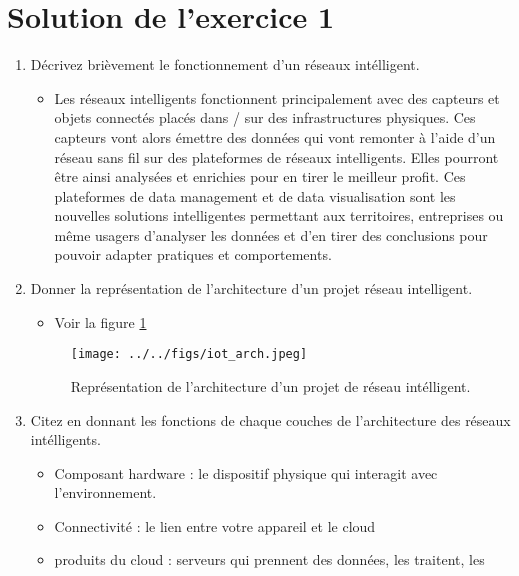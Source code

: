 \section*{Solution de l'exercice 1 \MarksTwo}

\begin{enumerate}
      \item Décrivez brièvement le fonctionnement d'un réseaux intélligent.
            \begin{itemize}
                  \item Les réseaux intelligents fonctionnent principalement avec des capteurs et objets connectés placés dans / sur des infrastructures physiques. Ces capteurs vont alors émettre des données qui vont remonter à l’aide d’un réseau sans fil sur des plateformes de réseaux intelligents. Elles pourront être ainsi analysées et enrichies pour en tirer le meilleur profit. Ces plateformes de data management et de data visualisation sont les nouvelles solutions intelligentes permettant aux territoires, entreprises ou même usagers d’analyser les données et d’en tirer des conclusions pour pouvoir adapter pratiques et comportements.
            \end{itemize}
      \item Donner la représentation de l’architecture d’un projet réseau intelligent.
            \begin{itemize}
                  \item Voir la figure \ref{fig:arch}
            \end{itemize}
            \begin{figure}[!ht]
                  \texttt{[image: ../../figs/iot\_arch.jpeg]}
                  \caption{Représentation de l'architecture d'un projet de réseau intélligent.}
                  \label{fig:arch}
            \end{figure}
      \item Citez en donnant les fonctions de chaque couches de l'architecture des réseaux intélligents.
            \begin{itemize}
                  \item  Composant hardware : le dispositif physique qui interagit avec l’environnement.
                  \item Connectivité : le lien entre votre appareil et le cloud
                  \item produits du cloud : serveurs qui prennent des données, les traitent, les

\end{itemize}
\end{enumerate}

